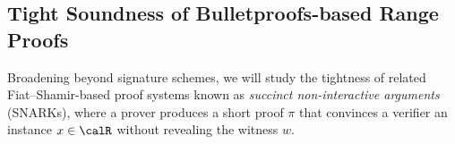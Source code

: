 






\subsection{Tight Soundness of Bulletproofs-based Range Proofs} 

Broadening beyond signature schemes, we will study the tightness of related Fiat–Shamir-based proof systems known as
\emph{succinct non-interactive arguments} (SNARKs), where a prover 
produces a short proof $\pi$ that convinces a verifier an instance $x \in \calR$
without revealing the witness $w$. 

